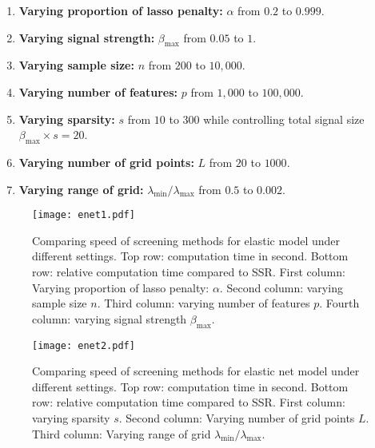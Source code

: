 \begin{enumerate}
    \item \textbf{Varying proportion of lasso penalty:} $\alpha$ from $0.2$ to $0.999$.
    \item \textbf{Varying signal strength:} $\beta_{\max}$ from $0.05$ to $1$.
    \item \textbf{Varying sample size:} $n$ from $200$ to $10,000$.
    \item \textbf{Varying number of features:} $p$ from $1,000$ to $100,000$.
    \item \textbf{Varying sparsity:} $s$ from $10$ to $300$ while controlling total signal size $\beta_{\max}\times s=20$.
    \item \textbf{Varying number of grid points:}  $L$ from $20$ to $1000$.
    \item \textbf{Varying range of grid:}  $\lambda_{\min}/\lambda_{\max}$ from $0.5$ to $0.002$.
\end{enumerate}

\begin{figure}[ht]
    \centering
    \texttt{[image: enet1.pdf]}    \caption[Comparison of screening methods for elastic net in simulation 1]{Comparing speed of screening methods for elastic model under different settings. Top row: computation time in second. Bottom row: relative computation time compared to SSR. First column: Varying proportion of lasso penalty: $\alpha$. Second column: varying sample size $n$. Third column: varying number of features $p$. Fourth column: varying signal strength $\beta_{\max}$.}
    \label{fig:sim1}
\end{figure}

\begin{figure}[ht]
    \centering
    \texttt{[image: enet2.pdf]}    \caption[Comparison of screening methods for elastic net in simulation 2]{Comparing speed of screening methods for elastic net model under different settings. Top row: computation time in second. Bottom row: relative computation time compared to SSR. First column: varying sparsity $s$. Second column: Varying number of grid points $L$. Third column: Varying range of grid $\lambda_{\min}/\lambda_{\max}$.}
    \label{fig:sim2}
\end{figure}

